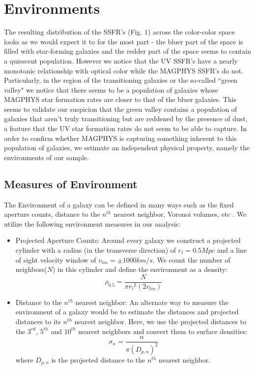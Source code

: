 \documentclass[iop]{emulateapj}
\begin{document}
\section{Environments}



The resulting distribution of the SSFR's (Fig. $1$) across the color-color space looks as we would expect it to for the most part - the bluer part of the space is filled with star-forming galaxies and the redder part of the space seems to contain a quiescent population. However we notice that the UV SSFR's have a nearly monotonic relationship with optical color while the MAGPHYS SSFR's do not. Particularly, in the region of the transitioning galaxies or the so-called ``green valley" we notice that there seems to be a population of galaxies whose MAGPHYS star formation rates are closer to that of the bluer galaxies. This seems to validate our suspicion that the green valley contains a population of galaxies that aren't truly transitioning but are reddened by the presence of dust, a feature that the UV star formation rates do not seem to be able to capture. In order to confirm whether MAGPHYS is capturing something inherent to this population of galaxies, we estimate an independent physical property, namely the environments of our sample.\\


\subsection{Measures of Environment}

The Environment of a galaxy can be defined in many ways such as the fixed aperture counts, distance to the $n^{th}$ nearest neighbor, Voronoi volumes, etc \cite[]{Coop06}. We utilize the following environment measures in our analysis:\\


\begin{itemize}
\item{Projected Aperture Counts: Around every galaxy we construct a projected cylinder with a radius (in the transverse direction) of $r_{t} = 0.5 Mpc$ and a line of sight velocity window of $v_{los} = \pm 1000 km/s$. We count the number of neighbors($N$) in this cylinder and define the environment as a density:
$$ \rho_{0.5} = \frac{N}{\pi {r_{t}}^{2} (2v_{los})} $$}
\item{Distance to the $n^{th}$ nearest neighbor: An alternate way to measure the environment of a galaxy would be to estimate the distances and projected distances to its $n^{th}$ nearest neighbor.  Here, we use the projected distances to the $3^{rd}$, $5^{th}$ and $10^{th}$ nearest neighbors and convert them to surface densities:
$$ \sigma_{n} = \frac{n}{\pi (D_{p,n})^{2}} $$ where $D_{p,n}$ is the projected distance to the $n^{th}$ nearest neighbor.}
\end{itemize} 
\end{document}
